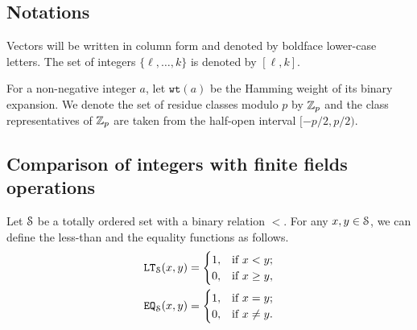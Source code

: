\subsection{Notations}
  Vectors will be written in column form and denoted by boldface lower-case letters. 
  The set of integers $\{\ell,\ldots,k\}$ is denoted by $[\ell,k]$.

  For a non-negative integer $a$, let $\texttt{wt}(a)$ be the Hamming weight of its binary expansion. We denote the set of residue classes modulo $p$ by $\Z_p$ and the class representatives of $\Z_p$ are taken from the half-open interval $[-p/2, p/2)$.

\subsection{Comparison of integers with finite fields operations}
  Let $\S$ be a totally ordered set with a binary relation $<$.
  For any $x,y \in \S$, we can define the less-than and the equality functions as follows.
  \begin{align*}
    \LT_\S(x,y) = 
    \begin{cases}
      1, & \text{if } x < y; \\
      0, & \text{if } x \ge y, \\
    \end{cases}
    \\
    \EQ_\S(x,y) = 
    \begin{cases}
      1, & \text{if } x = y; \\
      0, & \text{if } x \neq y. \\
    \end{cases}
  \end{align*}

